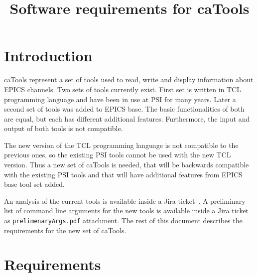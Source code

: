\documentclass[12pt,a4paper]{article}
\title{Software requirements for caTools}
\date{}
\begin{document}
\maketitle


\section{Introduction}
caTools represent a set of tools used to read, write and display information about EPICS channels. Two sets of tools currently exist. First set is written in TCL programming language and have been in use at PSI for many years. Later a second set of tools was added to EPICS base. The basic functionalities of both are equal, but each has different additional features. Furthermore, the input and output of both tools is not compatible. 

The new version of the TCL programming language is not compatible to the previous ones, so the existing PSI tools cannot be used with the new TCL version. Thus a new set of caTools is needed, that will be backwards compatible with the existing PSI tools and that will have additional features from EPICS base tool set added.

An analysis of the current tools is available inside a Jira ticket~\cite{jira_analyze}. A preliminary list of command line arguments for the new tools is available inside a Jira ticket~\cite{jira_requirements} as \texttt{prelimenaryArgs.pdf} attachment. The rest of this document describes the requirements for the new set of caTools.

\section{Requirements}
\end{document}
